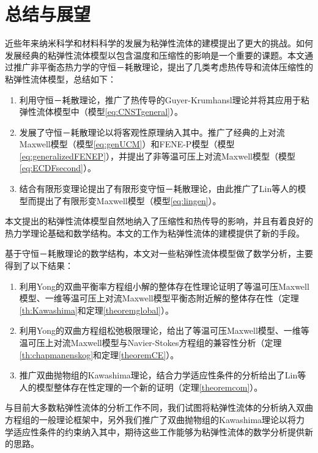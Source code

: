 \chapter{总结与展望}

% 
近些年来纳米科学和材料科学的发展为粘弹性流体的建模提出了更大的挑战。如何发展经典的粘弹性流体模型以包含温度和压缩性的影响是一个重要的课题。本文通过推广非平衡态热力学的守恒－耗散理论，提出了几类考虑热传导和流体压缩性的粘弹性流体模型，总结如下：
\begin{enumerate}
	\item 利用守恒－耗散理论，推广了热传导的Guyer-Krumhansl理论并将其应用于粘弹性流体模型中（模型\eqref{eq:CNSTgeneral}）。
	\item 发展了守恒－耗散理论以将客观性原理纳入其中。推广了经典的上对流Maxwell模型（模型\eqref{eq:genUCM}）和FENE-P模型（模型\eqref{eq:generalizedFENEP}），并提出了非等温可压上对流Maxwell模型（模型\eqref{eq:ECDFsecond}）。
	\item 结合有限形变理论提出了有限形变守恒－耗散理论，由此推广了Lin等人的模型而提出了有限形变Maxwell模型（模型\eqref{eq:lingen}）。
\end{enumerate}
本文提出的粘弹性流体模型自然地纳入了压缩性和热传导的影响，并且有着良好的热力学理论基础和数学结构。本文的工作为粘弹性流体的建模提供了新的手段。

基于守恒－耗散理论的数学结构，本文对一些粘弹性流体模型做了数学分析，主要得到了以下结果：
\begin{enumerate}
	\item 利用Yong的双曲平衡率方程组小解的整体存在性理论证明了等温可压Maxwell模型、一维等温可压上对流Maxwell模型平衡态附近解的整体存在性（定理\ref{th:Kawashima}和定理\ref{theoremglobal}）。
	\item 利用Yong的双曲方程组松弛极限理论，给出了等温可压Maxwell模型、一维等温可压上对流Maxwell模型与Navier-Stokes方程组的兼容性分析（定理\ref{th:chapmanenskog}和定理\ref{theoremCE}）。
	\item 推广双曲抛物组的Kawashima理论，结合力学适应性条件的分析给出了Lin等人的模型整体存在性定理的一个新的证明（定理\ref{theoremcom}）。
\end{enumerate}
与目前大多数粘弹性流体的分析工作不同，我们试图将粘弹性流体的分析纳入双曲方程组的一般理论框架中，另外我们推广了双曲抛物组的Kawashima理论以将力学适应性条件的约束纳入其中，期待这些工作能够为粘弹性流体的数学分析提供新的思路。


